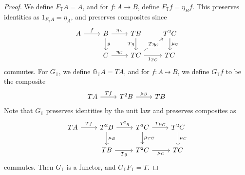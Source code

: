 \begin{proof}
    We define \( F_{\mathbb T} A = A \), and for \( f : A \to B \), define \( F_{\mathbb T} f = \eta_B f \).
    This preserves identities as \( 1_{F_{\mathbb T} A} = \eta_A \), and preserves composites since%
    \[\begin{tikzcd}
        A & B & TB & {T^2C} \\
        & C & TC & TC
        \arrow["f", from=1-1, to=1-2]
        \arrow["{\eta_B}", from=1-2, to=1-3]
        \arrow["Tg"', from=1-3, to=2-3]
        \arrow["{T\eta_C}"{description}, from=2-3, to=1-4]
        \arrow["{\mu_C}", from=1-4, to=2-4]
        \arrow["{1_{TC}}"', from=2-3, to=2-4]
        \arrow["g", from=1-2, to=2-2]
        \arrow["{\eta_C}", from=2-2, to=2-3]
    \end{tikzcd}\]
    commutes.
    For \( G_{\mathbb T} \), we define \( \mathbb G_{\mathbb T} A = TA \), and for \( f : A \rightdotarrow B \), we define \( G_{\mathbb T} f \) to be the composite
\[\begin{tikzcd}
	TA & T^2B & TB
	\arrow["Tf", from=1-1, to=1-2]
	\arrow["{\mu_B}", from=1-2, to=1-3]
\end{tikzcd}\]
    Note that \( G_{\mathbb T} \) preserves identities by the unit law and preserves composites as
\[\begin{tikzcd}
	TA & {T^2B} & {T^3C} & {T^2C} \\
	& TB & {T^2C} & TC
	\arrow["Tf", from=1-1, to=1-2]
	\arrow["{T^2g}", from=1-2, to=1-3]
	\arrow["{T\mu_C}", from=1-3, to=1-4]
	\arrow["{\mu_C}", from=1-4, to=2-4]
	\arrow["{\mu_{TC}}", from=1-3, to=2-3]
	\arrow["{\mu_C}"', from=2-3, to=2-4]
	\arrow["{\mu_B}", from=1-2, to=2-2]
	\arrow["Tg"', from=2-2, to=2-3]
\end{tikzcd}\]
    commutes.
    Then \( G_{\mathbb T} \) is a functor, and \( G_{\mathbb T} F_{\mathbb T} = T \).

\end{proof}
